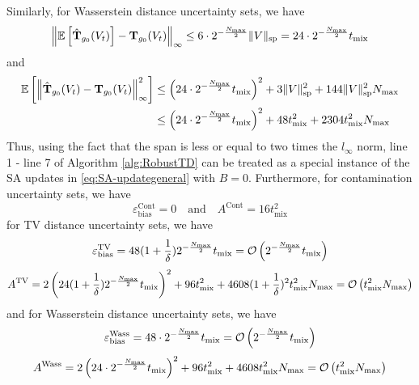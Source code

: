 Similarly, for Wasserstein distance uncertainty sets, we have
\begin{equation}
        \left\lVert\mathbb{E}\left[\hat{\mathbf{T}}_{g_0}(V_t)\right]-{\mathbf{T}}_{g_0}(V_t)\right\rVert_\infty \leq 6\cdot 2^{-\frac{N_{\max}}{2}}\|V\|_{\mathrm{sp}}= 24\cdot 2^{-\frac{N_{\max}}{2}}t_{\mathrm{mix}}
\end{equation}
and
\begin{align} 
        \mathbb{E}\left[\left\lVert\hat{\mathbf{T}}_{g_0}(V_t)-{\mathbf{T}}_{g_0}(V_t)\right\rVert^2_\infty\right] &\leq \left( 24\cdot 2^{-\frac{N_{\max}}{2}}t_{\mathrm{mix}} \right)^2 + 3\|V\|_{\mathrm{sp}}^2 + 144\|V\|_{\mathrm{sp}}^2 N_{\max} \nonumber\\
        &\leq \left( 24\cdot 2^{-\frac{N_{\max}}{2}}t_{\mathrm{mix}} \right)^2 + 48t_{\mathrm{mix}}^2 + 2304t_{\mathrm{mix}}^2 N_{\max}
\end{align}
Thus, using the fact that the span is less or equal to two times the $l_\infty$ norm, line 1 - line 7 of Algorithm \ref{alg:RobustTD} can be treated as a special instance of the SA updates in \eqref{eq:SA-updategeneral} with $B=0$. Furthermore, for contamination uncertainty sets, we have
\begin{equation}  \label{eq:firsteq}
    \varepsilon^{\text{Cont}}_{\text{bias}}=0 \quad \text{and} \quad A^{\text{Cont}}=16t^2_{\mathrm{mix}}
\end{equation}
for TV distance uncertainty sets, we have
\begin{equation}
    \varepsilon^{\text{TV}}_{\text{bias}}=48(1+\frac{1}{\delta}) 2^{-\frac{N_{\max}}{2}}t_{\mathrm{mix}} = \operatorname*{\mathcal{O}}\left( 2^{-\frac{N_{\max}}{2}}t_{\mathrm{mix}}   \right)
\end{equation}
\begin{equation}
    A^{\text{TV}}=2\left( 24(1+\frac{1}{\delta}) 2^{-\frac{N_{\max}}{2}}t_{\mathrm{mix}} \right)^2 + 96t_{\mathrm{mix}}^2 + 4608(1+\frac{1}{\delta})^2t_{\mathrm{mix}}^2 N_{\max} = \operatorname*{\mathcal{O}}\left(  t_{\mathrm{mix}}^2 N_{\max}  \right)
\end{equation}
and for Wasserstein distance uncertainty sets, we have
\begin{equation}
    \varepsilon^{\text{Wass}}_{\text{bias}}=48\cdot 2^{-\frac{N_{\max}}{2}}t_{\mathrm{mix}} = \operatorname*{\mathcal{O}}\left( 2^{-\frac{N_{\max}}{2}}t_{\mathrm{mix}}   \right)
\end{equation}
\begin{equation}  \label{eq:lasteq}
    A^{\text{Wass}}=2\left( 24\cdot 2^{-\frac{N_{\max}}{2}}t_{\mathrm{mix}} \right)^2 + 96t_{\mathrm{mix}}^2 + 4608 t_{\mathrm{mix}}^2 N_{\max} = \operatorname*{\mathcal{O}}\left(  t_{\mathrm{mix}}^2 N_{\max}  \right)
\end{equation}

